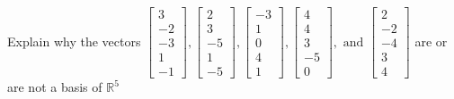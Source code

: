 \documentclass{article}
\begin{document}
\begin{exerciseStatement}
    Explain why the vectors \(\left[\begin{array}{r}
3 \\
-2 \\
-3 \\
1 \\
-1
\end{array}\right] , \left[\begin{array}{r}
2 \\
3 \\
-5 \\
1 \\
-5
\end{array}\right] , \left[\begin{array}{r}
-3 \\
1 \\
0 \\
4 \\
1
\end{array}\right] , \left[\begin{array}{r}
4 \\
4 \\
3 \\
-5 \\
0
\end{array}\right] , \text{ and } \left[\begin{array}{r}
2 \\
-2 \\
-4 \\
3 \\
4
\end{array}\right]\) are or are not a basis of \(\mathbb{R}^5\)


  
\end{exerciseStatement}
\end{document}
